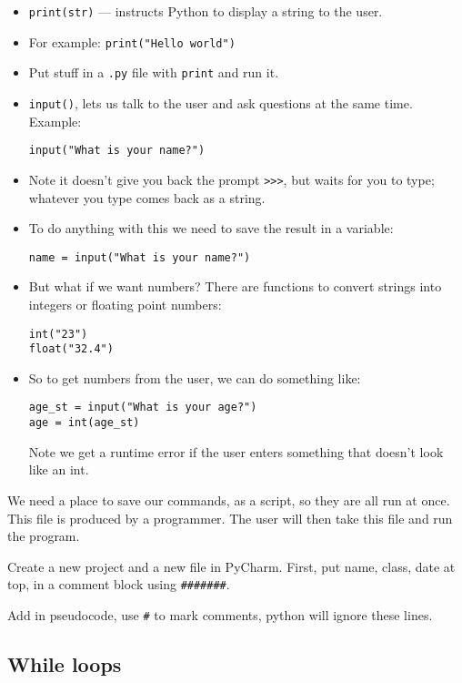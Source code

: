 \documentclass{article}
\begin{document}
\begin{itemize}
\item \verb|print(str)| --- instructs Python to display a string to
  the user.
\item For example: \verb|print("Hello world")|

\item Put stuff in a \verb|.py| file with \verb|print| and run it.

\item \verb|input()|, lets us talk to the user and ask questions
  at the same time.  Example:
\begin{verbatim}
input("What is your name?")
\end{verbatim}
\item Note it doesn't give you back the prompt \verb|>>>|, but waits
  for you to type; whatever you type comes back as a string.

\item  To do anything with this we need to save the result in a variable:
\begin{verbatim}
name = input("What is your name?")
\end{verbatim}

\item But what if we want numbers? There are functions to convert
  strings into integers or floating point numbers:
\begin{verbatim}
int("23")
float("32.4")
\end{verbatim}

\item So to get numbers from the user, we can do something like:
\begin{verbatim}
age_st = input("What is your age?")
age = int(age_st)
\end{verbatim}

  Note we get a runtime error if the user enters something that
  doesn't look like an int.
\end{itemize}

We need a place to save our commands, as a script, so they are all run
at once.  This file is produced by a programmer.  The user will then
take this file and run the program.

Create a new project and a new file in PyCharm.  First, put name,
class, date at top, in a comment block using \verb|#######|.

Add in pseudocode, use \verb|#| to mark comments, python will ignore
these lines.

\subsection*{While loops}
\end{document}
